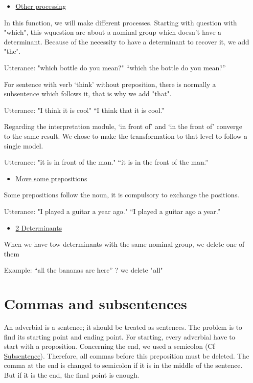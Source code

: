 \documentclass[twoside,a4paper,10pt]{report}
\newcommand{\dokutitleleveltree}[1]{\section{#1}}
\newcommand{\dokuunderline}[1]{\underline{#1}}
\newcommand{\dokuitem}{\item}
\begin{document}
\begin{itemize}
\dokuitem  \dokuunderline{Other processing}
\end{itemize}
In this function, we will make different processes. Starting with question with "which", this w{\textunderscore}question are about a nominal group which doesn’t have a determinant. Because of the necessity to have a determinant to recover it, we add "the".


\small
\begin{verbatimtab}
  Utterance: "which bottle do you mean?"
  “which the bottle do you mean?”
\end{verbatimtab}
\normalsize
For sentence with verb ‘think’ without preposition, there is normally a subsentence which follows it, that is why we add "that".


\small
\begin{verbatimtab}
  Utterance: "I think it is cool"
  “I think that it is cool.”
\end{verbatimtab}
\normalsize
Regarding the interpretation module, ‘in front of’ and ‘in the front of’ converge to the same result. We chose to make the transformation to that level to follow a single model.


\small
\begin{verbatimtab}
  Utterance: "it is in front of the man."
  “it is in the front of the man.”
\end{verbatimtab}
\normalsize

\begin{itemize}
\dokuitem  \dokuunderline{Move some prepositions}
\end{itemize}
Some prepositions follow the noun, it is compulsory to exchange the positions.


\small
\begin{verbatimtab}
  Utterance: "I played a guitar a year ago."
  “I played a guitar ago a year.”
\end{verbatimtab}
\normalsize

\begin{itemize}
\dokuitem  \dokuunderline{2 Determinants}
\end{itemize}
When we have tow determinants with the same nominal group, we delete one of them


\small
\begin{verbatimtab}
  Example: “all the bananas are here” ? we delete "all"
\end{verbatimtab}
\normalsize

\dokutitleleveltree{Commas and subsentences}
\label{f50e61d6a41031b0a4d3b4c2287c8dfa}%
An adverbial is a sentence; it should be treated as sentences. The problem is to find its starting point and ending point. For starting, every adverbial have to start with a proposition. Concerning the end, we used a semicolon (Cf \hyperref[60550ca08c44dda94b3d7a018a352868]{Subsentence}). Therefore, all commas before this preposition must be deleted. The comma at the end is changed to semicolon if it is in the middle of the sentence. But if it is the end, the final point is enough.
\end{document}
